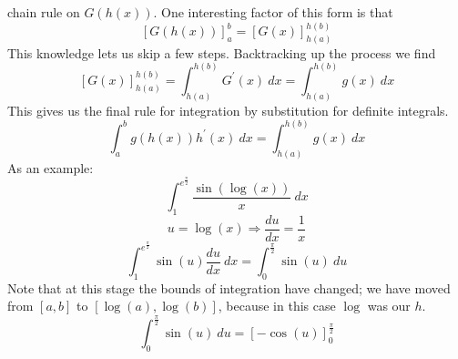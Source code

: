 \documentclass[12pt]{report}
\begin{document}
\begin{flushleft}
chain rule on \(G(h(x))\). One interesting factor of this form is that
\[\left[G(h(x))\right]_a^b = \left[G(x)\right]_{h(a)}^{h(b)}\]
This knowledge lets us skip a few steps. Backtracking up the process we find
\[\left[G(x)\right]_{h(a)}^{h(b)} = \int_{h(a)}^{h(b)}G^\prime(x) \:dx
= \int_{h(a)}^{h(b)}g(x) \:dx\]
This gives us the final rule for integration by substitution for definite 
integrals.
\[\int_a^b g(h(x))h^\prime(x) \:dx = \int_{h(a)}^{h(b)} g(x) \:dx\]
As an example:
\[\int_1^{e^\frac{\pi}{2}} \frac{\sin(\log(x))}{x} \:dx\]
\[u = \log(x) \Rightarrow \frac{du}{dx} = \frac{1}{x}\]
\[\int_1^{e^\frac{\pi}{2}} \sin(u)\frac{du}{dx} \:dx = 
\int_0^\frac{\pi}{2} \sin(u) \:du\]
Note that at this stage the bounds of integration have changed; we have moved
from \([a, b]\) to \([\log(a), \log(b)]\), because in this case \(\log\) was 
our \(h\).
\[\int_0^\frac{\pi}{2} \sin(u) \:du = \left[-\cos(u)\right]_0^\frac{\pi}{2}\] 

\end{flushleft}
\end{document}
